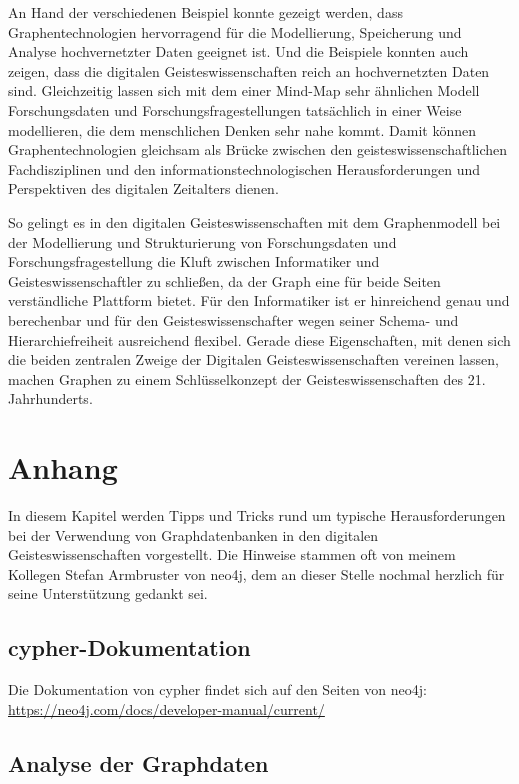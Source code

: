 \documentclass[ngerman,]{scrreprt}
\begin{document}
An Hand der verschiedenen Beispiel konnte gezeigt werden, dass Graphentechnologien hervorragend für die Modellierung, Speicherung und Analyse hochvernetzter Daten geeignet ist. Und die Beispiele konnten auch zeigen, dass die digitalen Geisteswissenschaften reich an hochvernetzten Daten sind. Gleichzeitig lassen sich mit dem einer Mind-Map sehr ähnlichen Modell Forschungsdaten und Forschungsfragestellungen tatsächlich in einer Weise modellieren, die dem menschlichen Denken sehr nahe kommt. Damit können Graphentechnologien gleichsam als Brücke zwischen den geisteswissenschaftlichen Fachdisziplinen und den informationstechnologischen Herausforderungen und Perspektiven des digitalen Zeitalters dienen.

So gelingt es in den digitalen Geisteswissenschaften mit dem Graphenmodell bei der Modellierung und Strukturierung von Forschungsdaten und Forschungsfragestellung die Kluft zwischen Informatiker und Geisteswissenschaftler zu schließen, da der Graph eine für beide Seiten verständliche Plattform bietet. Für den Informatiker ist er hinreichend genau und berechenbar und für den Geisteswissenschafter wegen seiner Schema- und Hierarchiefreiheit ausreichend flexibel. Gerade diese Eigenschaften, mit denen sich die beiden zentralen Zweige der Digitalen Geisteswissenschaften vereinen lassen, machen Graphen zu einem Schlüsselkonzept der Geisteswissenschaften des 21. Jahrhunderts.

\chapter{Anhang}\label{anhang}

In diesem Kapitel werden Tipps und Tricks rund um typische Herausforderungen bei der Verwendung von Graphdatenbanken in den digitalen Geisteswissenschaften vorgestellt. Die Hinweise stammen oft von meinem Kollegen Stefan Armbruster von neo4j, dem an dieser Stelle nochmal herzlich für seine Unterstützung gedankt sei.

\section{cypher-Dokumentation}\label{cypher-dokumentation}

Die Dokumentation von cypher findet sich auf den Seiten von neo4j: \url{https://neo4j.com/docs/developer-manual/current/}

\section{Analyse der Graphdaten}\label{analyse-der-graphdaten}
\end{document}
